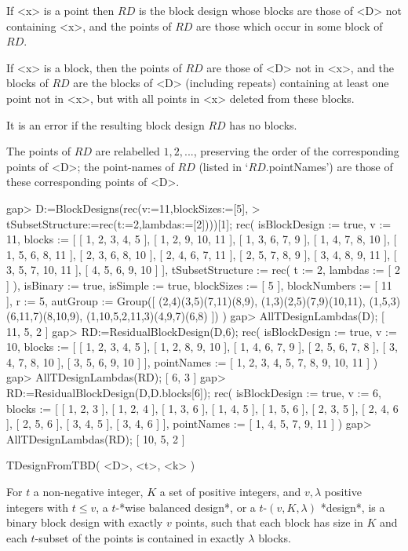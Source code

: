 If <x> is a point then $RD$ is the block design whose blocks are those
of <D> not containing <x>, and the points of $RD$ are those which occur
in some block of $RD$.

If <x> is a block, then the points of $RD$ are those of <D> not in
<x>, and the blocks of $RD$ are the blocks of <D> (including repeats)
containing at least one point not in <x>, but with all points in <x>
deleted from these blocks.

It is an error if the resulting block design $RD$ has no blocks.

The points of $RD$ are relabelled $1,2,...$, preserving the order of
the corresponding points of <D>; the point-names of $RD$ (listed in
`$RD$.pointNames') are those of these corresponding points of <D>.

\beginexample
gap> D:=BlockDesigns(rec(v:=11,blockSizes:=[5],
>       tSubsetStructure:=rec(t:=2,lambdas:=[2])))[1];
rec( isBlockDesign := true, v := 11, 
  blocks := [ [ 1, 2, 3, 4, 5 ], [ 1, 2, 9, 10, 11 ], [ 1, 3, 6, 7, 9 ], 
      [ 1, 4, 7, 8, 10 ], [ 1, 5, 6, 8, 11 ], [ 2, 3, 6, 8, 10 ], 
      [ 2, 4, 6, 7, 11 ], [ 2, 5, 7, 8, 9 ], [ 3, 4, 8, 9, 11 ], 
      [ 3, 5, 7, 10, 11 ], [ 4, 5, 6, 9, 10 ] ], 
  tSubsetStructure := rec( t := 2, lambdas := [ 2 ] ), isBinary := true, 
  isSimple := true, blockSizes := [ 5 ], blockNumbers := [ 11 ], r := 5, 
  autGroup := Group([ (2,4)(3,5)(7,11)(8,9), (1,3)(2,5)(7,9)(10,11), 
      (1,5,3)(6,11,7)(8,10,9), (1,10,5,2,11,3)(4,9,7)(6,8) ]) )
gap> AllTDesignLambdas(D);      
[ 11, 5, 2 ]
gap> RD:=ResidualBlockDesign(D,6);
rec( isBlockDesign := true, v := 10, 
  blocks := [ [ 1, 2, 3, 4, 5 ], [ 1, 2, 8, 9, 10 ], [ 1, 4, 6, 7, 9 ], 
      [ 2, 5, 6, 7, 8 ], [ 3, 4, 7, 8, 10 ], [ 3, 5, 6, 9, 10 ] ], 
  pointNames := [ 1, 2, 3, 4, 5, 7, 8, 9, 10, 11 ] )
gap> AllTDesignLambdas(RD);
[ 6, 3 ]
gap> RD:=ResidualBlockDesign(D,D.blocks[6]);
rec( isBlockDesign := true, v := 6, 
  blocks := [ [ 1, 2, 3 ], [ 1, 2, 4 ], [ 1, 3, 6 ], [ 1, 4, 5 ], 
      [ 1, 5, 6 ], [ 2, 3, 5 ], [ 2, 4, 6 ], [ 2, 5, 6 ], [ 3, 4, 5 ], 
      [ 3, 4, 6 ] ], pointNames := [ 1, 4, 5, 7, 9, 11 ] )
gap> AllTDesignLambdas(RD);
[ 10, 5, 2 ]
\endexample 



\>TDesignFromTBD( <D>, <t>, <k> )

For $t$ a non-negative integer, $K$ a set of positive integers, and
$v,\lambda$ positive integers with $t\le v$, a $t$-*wise balanced design*,
or a $t$-$(v,K,\lambda)$ *design*, is a binary block design with exactly
$v$ points, such that each block has size in $K$ and each $t$-subset of
the points is contained in exactly $\lambda$ blocks.


